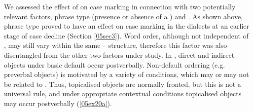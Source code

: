 \documentclass[output=paper,colorlinks,citecolor=brown]{langscibook}
\begin{document}
We assessed the effect of  on case marking in connection with two potentially relevant factors, phrase type (presence or absence of a ) and . As shown above, phrase type proved to have an effect on case marking in the  dialects at an earlier stage of case decline (Section \ref{05sec3}). Word order, although not independent of , may still vary within the same -- structure, therefore this factor was also disentangled from the other two factors under study. In , direct and indirect objects under basic default  occur postverbally. Non-default ordering (e.g. preverbal objects) is motivated by a variety of conditions, which may or may not be related to  \citep{georgieva1974, georgieva1983, dyer1992}. Thus, topicalised objects are normally fronted, but this is not a universal rule, and under appropriate contextual conditions topicalised objects may occur postverbally (\ref{05ex20a}).
	
\end{document}
